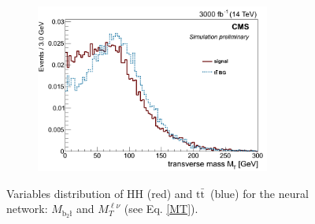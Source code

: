 \documentclass[10pt,a4paper]{article}
\newcommand{\ww}{7.7cm} %
\newcommand{\dd}{-2mm} %
\renewcommand{\tt}{$\text{t}\bar{\text{t}}$}
\begin{document}
\begin{figure}[h]
  \begin{subfigure}[b]{17cm}
      \centering
      \includegraphics[width=\ww]{figs/MT_lnu.png}
  \end{subfigure}	
  \vspace{\dd}
  \caption{Variables distribution of HH (red) and \tt\ (blue) for the neural network: $M_{\text{b}_2\text{\l}}$ and $M_T^{\ell\nu}$ (see Eq. \eqref{MT}).} \label{vars8}

\end{figure}
\end{document}

